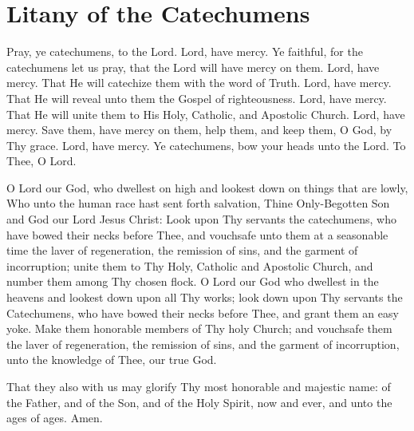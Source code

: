 \section{Litany of the Catechumens}

\begin{liturgicaltext}
    \deacon Pray, ye catechumens, to the Lord.
    \choir Lord, have mercy.
    \deacon Ye faithful, for the catechumens let us pray, that the Lord will have mercy on them.
    \choir Lord, have mercy.
    \deacon That He will catechize them with the word of Truth.
    \choir Lord, have mercy.
    \deacon That He will reveal unto them the Gospel of righteousness.
    \choir Lord, have mercy.
    \deacon That He will unite them to His Holy, Catholic, and Apostolic Church.
    \choir Lord, have mercy.
    \deacon Save them, have mercy on them, help them, and keep them, O God, by Thy grace.
    \choir Lord, have mercy.
    \deacon Ye catechumens, bow your heads unto the Lord.
    \choirsemisecret To Thee, O Lord. 
\end{liturgicaltext}
\begin{semisecret}
    \begin{secretprayerbasil}
        O Lord our God, who dwellest on high and lookest down on things that are lowly, Who unto the human race hast sent forth salvation, Thine Only-Begotten Son and God our Lord Jesus Christ: Look upon Thy servants the catechumens, who have bowed their necks before Thee, and vouchsafe unto them at a seasonable time the laver of regeneration, the remission of sins, and the garment of incorruption; unite them to Thy Holy, Catholic and Apostolic Church, and number them among Thy chosen flock.
        \switchcolumn
        O Lord our God who dwellest in the heavens and lookest down upon all Thy works; look down upon Thy servants the Catechumens, who have bowed their necks before Thee, and grant them an easy yoke. Make them honorable members of Thy holy Church; and vouchsafe them the laver of regeneration, the remission of sins, and the garment of incorruption, unto the knowledge of Thee, our true God.
    \end{secretprayerbasil}
\end{semisecret}
\begin{liturgicaltext}
    \priest That they also with us may glorify Thy most honorable and majestic name: of the Father, and of the Son, and of the Holy Spirit, now and ever, and unto the ages of ages.
    \choir Amen.
\end{liturgicaltext}